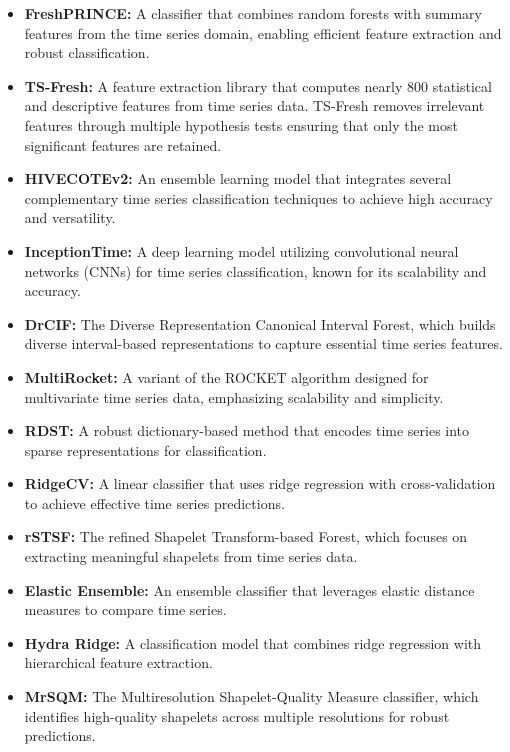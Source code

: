 \documentclass{ieeeaccess}
\begin{document}
\begin{itemize}
    \item \textbf{FreshPRINCE:} A classifier that combines random forests with summary features from the time series domain, enabling efficient feature extraction and robust classification.
    \item \textbf{TS-Fresh:} A feature extraction library that computes nearly 800 statistical and descriptive features from time series data. TS-Fresh removes irrelevant features through multiple hypothesis tests ensuring that only the most significant features are retained.
    \item \textbf{HIVECOTEv2:} An ensemble learning model that integrates several complementary time series classification techniques to achieve high accuracy and versatility.
    \item \textbf{InceptionTime:} A deep learning model utilizing convolutional neural networks (CNNs) for time series classification, known for its scalability and accuracy.
    \item \textbf{DrCIF:} The Diverse Representation Canonical Interval Forest, which builds diverse interval-based representations to capture essential time series features.
    \item \textbf{MultiRocket:} A variant of the ROCKET algorithm designed for multivariate time series data, emphasizing scalability and simplicity.
    \item \textbf{RDST:} A robust dictionary-based method that encodes time series into sparse representations for classification.
    \item \textbf{RidgeCV:} A linear classifier that uses ridge regression with cross-validation to achieve effective time series predictions.
    \item \textbf{rSTSF:} The refined Shapelet Transform-based Forest, which focuses on extracting meaningful shapelets from time series data.
    \item \textbf{Elastic Ensemble:} An ensemble classifier that leverages elastic distance measures to compare time series.
    \item \textbf{Hydra Ridge:} A classification model that combines ridge regression with hierarchical feature extraction.
    \item \textbf{MrSQM:} The Multiresolution Shapelet-Quality Measure classifier, which identifies high-quality shapelets across multiple resolutions for robust predictions.

\end{itemize}
\end{document}
